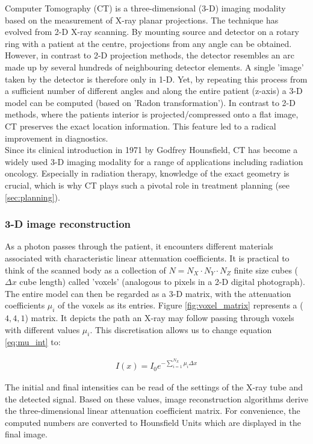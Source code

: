 Computer Tomography (CT) is a three-dimensional (3-D) imaging modality based on the measurement of X-ray planar projections.
The technique has evolved from 2-D X-ray scanning.
By mounting source and detector on a rotary ring with a patient at the centre, projections from any angle can be obtained.
However, in contrast to 2-D projection methods, the detector resembles an arc made up by several hundreds of neighbouring detector elements.
A single 'image' taken by the detector is therefore only in 1-D.
Yet, by repeating this process from a sufficient number of different angles and along the entire patient (z-axis) a 3-D model can be computed (based on 'Radon transformation').
In contrast to 2-D methods, where the patients interior is projected/compressed onto a flat image, CT preserves the exact location information. This feature led to a radical improvement in diagnostics.	 \\

Since its clinical introduction in 1971 by Godfrey Hounsfield, CT has become a widely used 3-D imaging modality for a range of applications including radiation oncology. Especially in radiation therapy, knowledge of the exact geometry is crucial, which is why CT plays such a pivotal role in treatment planning (see \ref{sec:planning}). \cite{Podgorsak, Maidment2014}

\subsubsection{3-D image reconstruction}
As a photon passes through the patient, it encounters different materials associated with characteristic linear attenuation coefficients.
It is practical to think of the scanned body as a collection of $N = N_X\cdot N_Y\cdot N_Z$ finite size cubes ($\Delta x$ cube length) called 'voxels' (analogous to pixels in a 2-D digital photograph).
The entire model can then be regarded as a 3-D matrix, with the attenuation coefficients $\mu_i$ of the voxels as its entries.
Figure \ref{fig:voxel_matrix} represents a ($4, 4, 1$) matrix.
It depicts the path an X-ray may follow passing through voxels with different values $\mu_i$.
This discretisation allows us to change equation \ref{eq:mu_int} to:

\begin{align}
\label{eq:mu_sum}
I(x) = I_0 e^{- \sum\limits_{i=1}^{N_X} \mu_i \Delta x}
\end{align}

The initial and final intensities can be read of the settings of the X-ray tube and the detected signal.
Based on these values, image reconstruction algorithms derive the three-dimensional linear attenuation coefficient matrix.
For convenience, the computed numbers are converted to Hounsfield Units which are displayed in the final image. \cite{Podgorsak, Maidment2014}


